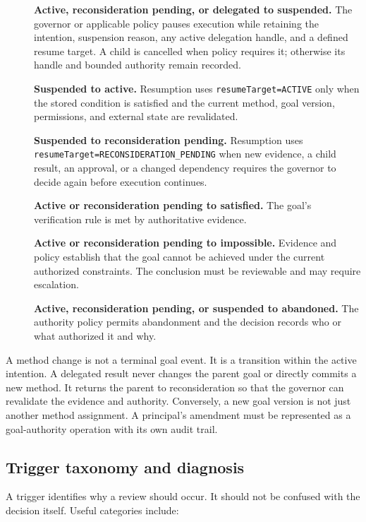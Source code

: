 \begin{description}
  \item[] \textbf{Active, reconsideration pending, or delegated to suspended.} The governor or applicable policy pauses execution while retaining the intention, suspension reason, any active delegation handle, and a defined resume target. A child is cancelled when policy requires it; otherwise its handle and bounded authority remain recorded.
  \item[] \textbf{Suspended to active.} Resumption uses \texttt{resumeTarget=ACTIVE} only when the stored condition is satisfied and the current method, goal version, permissions, and external state are revalidated.
  \item[] \textbf{Suspended to reconsideration pending.} Resumption uses \texttt{resumeTarget=RECONSIDERATION\_PENDING} when new evidence, a child result, an approval, or a changed dependency requires the governor to decide again before execution continues.
  \item[] \textbf{Active or reconsideration pending to satisfied.} The goal's verification rule is met by authoritative evidence.
  \item[] \textbf{Active or reconsideration pending to impossible.} Evidence and policy establish that the goal cannot be achieved under the current authorized constraints. The conclusion must be reviewable and may require escalation.
  \item[] \textbf{Active, reconsideration pending, or suspended to abandoned.} The authority policy permits abandonment and the decision records who or what authorized it and why.
\end{description}

A method change is not a terminal goal event. It is a transition within the active intention. A delegated result never changes the parent goal or directly commits a new method. It returns the parent to reconsideration so that the governor can revalidate the evidence and authority. Conversely, a new goal version is not just another method assignment. A principal's amendment must be represented as a goal-authority operation with its own audit trail.

\subsection{Trigger taxonomy and diagnosis}

A trigger identifies why a review should occur. It should not be confused with the decision itself. Useful categories include:

